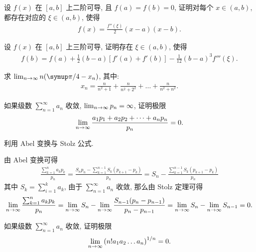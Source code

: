 \begin{exercise}[series=exer]
    \item 设 $ f(x) $ 在 $ [a, b] $ 上二阶可导, 且 $ f(a) = f(b)  = 0 $, 证明对每个 $ x \in (a, b) $, 都存在对应的 $ \xi \in (a, b) $, 使得
    \begin{align*}
        f(x) = \frac{f''(\xi)}{2} (x - a) (x - b).
    \end{align*}
    \item 设 $ f(x) $ 在 $ [a, b] $ 上三阶可导, 证明存在 $ \xi \in (a, b) $, 使得
    \begin{align*}
        f(b) = f(a) + \frac{1}{2} (b - a) [f'(a) + f'(b)] - \frac{1}{12} (b - a)^{3} f'''(\xi).
    \end{align*}
    \item 求 $ \limit{n}{\infty} n \qty(\pi/4 - x_{n}) $, 其中:
    \begin{align*}
        x_{n} = \frac{n}{n^{2} + 1} + \frac{n}{n^{2} + 2^{2}} + \dots + \frac{n}{n^{2} + n^{2}}.
    \end{align*}
    \item 如果级数 $ \sum_{n = 1}^{\infty} a_{n} $ 收敛, $ \lim_{n \to \infty} p_{n} = \infty $, 证明极限
    \begin{align*}
        \lim_{n \to \infty}\frac{a_{1} p_{1} + a_{2} p_{2} + \dots + a_{n} p_{n}}{p_{n}} = 0.
    \end{align*}
    \begin{hint}
        利用 Abel 变换与 Stolz 公式. 
    \end{hint}
    \begin{answer}
        由 Abel 变换可得
        \begin{align*}
            \frac{\sum_{k = 1}^{n} a_{k}p_{k}}{p_{n}} = \frac{S_{n}p_{n} - \sum_{k = 1}^{n - 1}S_{k}(p_{k + 1} - p_{k})}{p_{n}} = S_{n} - \frac{\sum_{k = 1}^{n - 1}S_{k}(p_{k + 1} - p_{k})}{p_{n}}
        \end{align*}
        其中 $ S_{k} = \sum_{i = 1}^{k}a_{k} $, 由于 $ \sum_{n = 1}^{\infty}a_{n} $ 收敛, 那么由 Stolz 定理可得
        \begin{align*}
            \lim_{n \to \infty}\frac{\sum_{k = 1}^{n} a_{k}p_{k}}{p_{n}} = \lim_{n \to \infty}S_{n} - \lim_{n \to \infty}\frac{S_{n - 1}(p_{n} - p_{n - 1})}{p_{n} - p_{n - 1}} = \lim_{n \to \infty}S_{n} - \lim_{n \to \infty}S_{n - 1} = 0.
        \end{align*}
    \end{answer}
    \item 如果级数 $ \sum_{n = 1}^{\infty} a_{n} $ 收敛, 证明极限
    \begin{align*}
        \limit{n}{\infty}\qty(n! a_{1} a_{2} \dots a_{n})^{1/n} = 0.

\end{align*}
\end{exercise}
